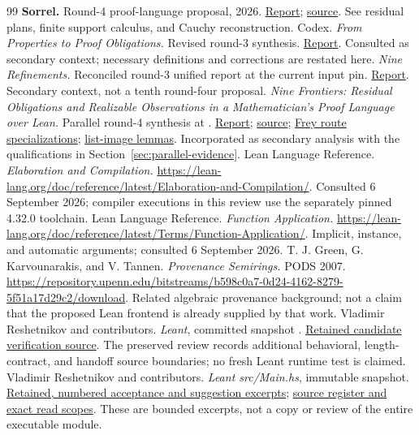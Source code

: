 \documentclass[11pt,letterpaper]{article}
\newcommand{\code}[1]{\texttt{\detokenize{#1}}}
\theoremstyle{definition}\newtheorem{definition}[proposition]{Definition}
\theoremstyle{remark}\newtheorem{remark}[proposition]{Remark}
\begin{document}
\begin{thebibliography}{99}
 \textbf{Sorrel.} Round-4 proof-language proposal, 2026. \href{../ideas/Sorrel/sorrel.pdf}{Report}; \href{../ideas/Sorrel/sorrel.tex}{source}. See residual plans, finite support calculus, and Cauchy reconstruction.
 Codex. \emph{From Properties to Proof Obligations.} Revised round-3 synthesis. \href{../../round-3/synthesis/unified-report.pdf}{Report}. Consulted as secondary context; necessary definitions and corrections are restated here.
 \emph{Nine Refinements.} Reconciled round-3 unified report at the current input pin. \href{../../round-3/unified_report/unified_report.pdf}{Report}. Secondary context, not a tenth round-four proposal.
 \emph{Nine Frontiers: Residual Obligations and Realizable Observations in a Mathematician's Proof Language over Lean.} Parallel round-4 synthesis at \code{c92ef05}. \href{../unified_report/unified_report.pdf}{Report}; \href{../unified_report/unified_report.tex}{source}; \href{../unified_report/experiments/lean/FreyRoutes.lean}{Frey route specializations}; \href{../unified_report/experiments/lean/ListImage.lean}{list-image lemmas}. Incorporated as secondary analysis with the qualifications in Section~\ref{sec:parallel-evidence}.
 Lean Language Reference. \emph{Elaboration and Compilation.} \url{https://lean-lang.org/doc/reference/latest/Elaboration-and-Compilation/}. Consulted 6 September 2026; compiler executions in this review use the separately pinned 4.32.0 toolchain.
 Lean Language Reference. \emph{Function Application.} \url{https://lean-lang.org/doc/reference/latest/Terms/Function-Application/}. Implicit, instance, and automatic arguments; consulted 6 September 2026.
 T. J. Green, G. Karvounarakis, and V. Tannen. \emph{Provenance Semirings.} PODS 2007. \url{https://repository.upenn.edu/bitstreams/b598c0a7-0d24-4162-8279-5f51a17d29c2/download}. Related algebraic provenance background; not a claim that the proposed Lean frontend is already supplied by that work.
 Vladimir Reshetnikov and contributors. \emph{Leant}, committed snapshot \code{823259f}. \href{../../round-3/synthesis/evidence/leant-review/source/Verification.hs}{Retained candidate verification source}. The preserved review records additional behavioral, length-contract, and handoff source boundaries; no fresh Leant runtime test is claimed.
 Vladimir Reshetnikov and contributors. \emph{Leant src/Main.hs}, immutable \code{823259f} snapshot. \href{evidence/leant-review/main-excerpts.txt}{Retained, numbered acceptance and suggestion excerpts}; \href{evidence/leant-review/source-register.json}{source register and exact read scopes}. These are bounded excerpts, not a copy or review of the entire executable module.
\end{thebibliography}
\end{document}
